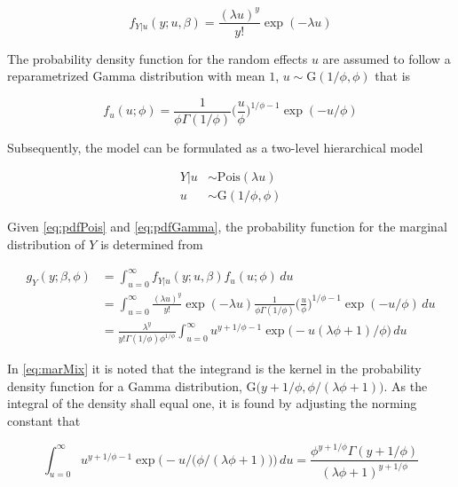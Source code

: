 \documentclass[preprint, 3p, authoryear]{elsarticle} %
\begin{document}
\begin{equation}\label{eq:pdfPois}
  f_{Y|u}(y;u,\beta)=\frac{(\lambda u)^{y}}{y!}\exp(-\lambda u)
\end{equation}

The probability density function for the random effects \(u\) are assumed to follow a reparametrized Gamma distribution with mean \(1\), \(u \sim \mathrm{G}(1/\phi,\phi)\) that is

\begin{equation} \label{eq:pdfGamma}
  f_{u}(u;\phi)=\frac{1}{\phi \Gamma(1/\phi)} \bigg(\frac{u}{\phi}\bigg)^{1/\phi-1} \exp (-u/\phi)
\end{equation}

Subsequently, the model can be formulated as a two-level hierarchical model

\begin{subequations} \label{eq:PoisGam}
  \begin{alignat}{2}
    {Y|u} &\sim \mathrm{Pois} (\lambda u) \label{eq:pois_g0} \\ 
    {u} &\sim \mathrm{G}( 1/\phi,\phi) \label{eq:pois_g1}
  \end{alignat}
\end{subequations}

Given \ref{eq:pdfPois} and \ref{eq:pdfGamma}, the probability function for the marginal distribution of \(Y\) is determined from

\begin{equation} \label{eq:marMix}
  \begin{aligned}
    g_{Y}(y;\beta,\phi)&=\int_{u=0}^\infty f_{Y|u}(y;u,\beta) f_{u}(u;\phi) \,du \\
    &=\int_{u=0}^\infty \frac{(\lambda u)^y}{y!} \exp (-\lambda u) \frac{1}{\phi \Gamma(1/\phi)} \bigg(\frac{u}{\phi}\bigg)^{1/\phi-1} \exp (-u /\phi) \,du\\
    &=\frac{\lambda^{y}}{y!\Gamma(1/\phi)\phi^{1/\phi}} \int_{u=0}^\infty u^{y+1/\phi-1} \exp \big(-u(\lambda \phi+1)/\phi\big) \,du
  \end{aligned}
\end{equation}

In \ref{eq:marMix} it is noted that the integrand is the kernel in the probability density function for a Gamma distribution, \(\mathrm{G}\big(y+1/\phi,\phi/(\lambda \phi+1)\big)\). As the integral of the density shall equal one, it is found by adjusting the norming constant that

\begin{equation}
  \int_{u=0}^\infty  u^{ y+ 1/\phi-1} \exp \Big(- u/\big(\phi/( \lambda \phi+1)\big)\Big) \,du = \frac{\phi^{ y+ 1/\phi}\Gamma( y+ 1/\phi)}{( \lambda \phi + 1)^{y+1/\phi}}
\end{equation}
\end{document}
